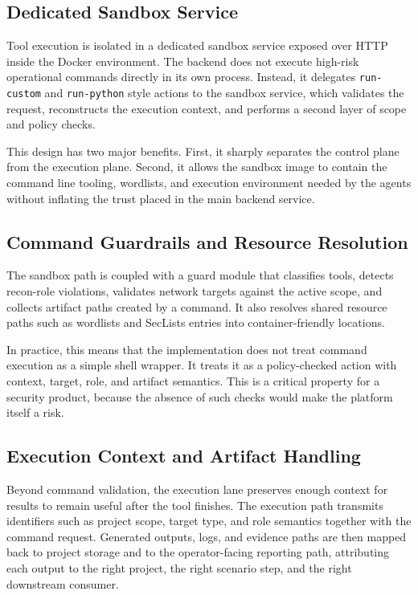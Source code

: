 \documentclass[12pt,a4paper]{report}
\begin{document}
\subsection{Dedicated Sandbox Service}

Tool execution is isolated in a dedicated sandbox service exposed over HTTP inside
the Docker environment. The backend does not execute high-risk operational commands
directly in its own process. Instead, it delegates \texttt{run-custom} and
\texttt{run-python} style actions to the sandbox service, which validates the
request, reconstructs the execution context, and performs a second layer of scope
and policy checks.

This design has two major benefits. First, it sharply separates the control plane
from the execution plane. Second, it allows the sandbox image to contain the command
line tooling, wordlists, and execution environment needed by the agents without
inflating the trust placed in the main backend service.

\subsection{Command Guardrails and Resource Resolution}

The sandbox path is coupled with a guard module that classifies tools, detects
recon-role violations, validates network targets against the active scope, and
collects artifact paths created by a command. It also resolves shared resource paths
such as wordlists and SecLists entries into container-friendly locations.

In practice, this means that the implementation does not treat command execution as a simple shell wrapper. It treats it as a policy-checked action with context, target, role, and artifact semantics. This is a critical property for a security product, because the absence of such checks would make the platform itself a risk.

\subsection{Execution Context and Artifact Handling}

Beyond command validation, the execution lane preserves enough context for results to
remain useful after the tool finishes. The execution path transmits identifiers such
as project scope, target type, and role semantics together with the command request.
Generated outputs, logs, and evidence paths are then mapped back to project storage
and to the operator-facing reporting path, attributing each output to the right
project, the right scenario step, and the right downstream consumer.
\end{document}
